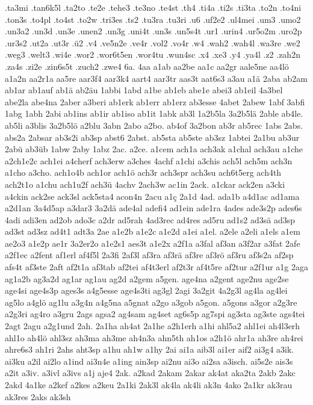 {.ta3mi
.tan6k5l
.ta2to
.te2e
.tehe3
.te3no
.te4st
.th4
.ti4a
.ti2s
.ti3ta
.to2n
.to4ni
.ton3s
.to4pl
.to4st
.to2w
.tri3es
.ts2
.tu3ra
.tu3ri
.u6
.uf2e2
.ul4mei
.um3
.umo2
.un3a2
.un3d
.un3e
.unen2
.un3g
.uni4t
.un3s
.un5s4t
.ur1
.urin4
.ur5o2m
.uro2p
.ur3s2
.ut2a
.ut3r
.ü2
.v4
.ve5n2e
.ve4r
.vol2
.vo4r
.w4
.wah2
.wah4l
.wa3re
.we2
.weg3
.welt3
.wi4e
.wor2
.wor6t5en
.wor4tu
.wun4sc
.x4
.xe3
.y4
.ya4l
.z2
.zah2n
.za4s
.zi2e
.zin6s5t
.zuch2
.zwe4
6a.
4aa
a1ab
aa2be
aa1c
aa2gr
aale5ne
aa4lö
a1a2n
aa2r1a
aa5re
aar3f4
aar3k4
aart4
aar3tr
aas3t
aat6s3
a3au
a1ä
2aba
ab2am
ab1ar
ab1auf
ab1ä
ab2äu
1abbi
1abd
a1be
ab1eb
abe1e
abei3
ab1eil
4a3bel
abe2la
abe4na
2aber
a3beri
ab1erk
ab1err
ab1erz
ab3esse
4abet
2abew
1abf
3abfi
1abg
1abh
2abi
ab1ins
ab1ir
ab1iso
ab1it
1abk
ab3l
1a2b5la
3a2b5lä
2able
ab4le.
ab5li
a3blis
3a2b5lö
a2blu
3abn
2abo
a2bo.
ab4of
3a2bon
ab3r
ab5rec
1abs
2abs.
abs2a
2absar
ab3s2i
ab3sp
abst6
2abst.
ab5sta
ab5ste
ab3sz
1abtei
2a1bu
ab3ur
2abü
ab3üb
1abw
2aby
1abz
2ac.
a2ce.
a1cem
ach1a
ach3ak
a1chal
ach3au
a1che
a2ch1e2c
ach1ei
a4cherf
ach3erw
a3ches
4achf
a1chi
a3chis
ach5l
ach5m
ach3n
a1cho
a3cho.
ach1o4b
ach1or
ach1ö
ach3r
ach3spr
ach3su
ach6t5erg
ach4th
ach2t1o
a1chu
ach1u2f
ach3ü
4achv
2ach3w
ac1in
2ack.
a1ckar
ack2en
a3cki
a4ckin
ack2se
ack3sl
ack5sta4
acon4n
2acu
a1ç
2a1d
4ad.
ada1b
a4d1ac
ad1ama
a2d1an
3a4d5ap
a3dar3
3a2dä
ade4al
adefi4
ad1ein
ade1ra
4ades
ade3s2p
ades6s
4adi
adi3en
ad2ob
ado3c
a2dr
ad5rah
4ad3rec
ad4res
ad5ru
ad1s2
ad3sä
ad3sp
ad3st
ad3sz
ad4t1
adt3a
2ae
a1e2b
a1e2c
a1e2d
a1ei
a1el.
a2ele
a2eli
a1els
a1em
ae2o3
a1e2p
ae1r
3a2er2o
a1e2s1
aes3t
a1e2x
a2f1a
a3fal
af3an
a3f2ar
a3fat
2afe
a2f1ec
a2fent
af1erl
af4f5l
2a3fi
2af3l
af3ra
af3rä
af3re
af3rö
af3ru
af3s2a
af2sp
afs4t
af3ste
2aft
af2t1a
af3tab
af2tei
af4t3erl
af2t3r
af4t5re
af2tur
a2f1ur
a1g
2aga
ag1a2b
ag3a2d
ag1ar
ag1au
ag2d
a2gem
a5gen.
age4na
a2gent
age2nu
age2se
age4si
age4s3p
ages3s
a4g5esse
age4s3ti
ag3gl
2agi
3a2git
4a2g3l
ag4la
ag4lei
ag5lo
a4glö
ag1lu
a3g4n
a4g5na
a5gnat
a2go
a3gob
a5gon.
a5gons
a3gor
a2g3re
a2g3ri
ag4ro
a3gru
2ags
agsa2
ag4sam
ag4set
ag6s5p
ag7spi
ag3sta
ag3ste
ags4tei
2agt
2agu
a2g1und
2ah.
2a1ha
ah4at
2a1he
a2h1erh
a1hi
ahl5a2
ahl1ei
ah4l3erh
ahl1o
ah4lö
ahl3sz
ah3ma
ah3me
ah4n3a
ahn5th
ah1os
a2h1ö
ahr1a
ah3re
ah4rei
ahre6s3
ah1ri
2ahs
aht3sp
a1hu
ah1w
a1hy
2ai
ai1a
aib3l
ai1er
aif2
ai3g4
a3ik.
ai3ku
a2il
ai2lo
a1ind
ai3n4e
a1ing
ain3sp
ai2nu
ai3o
ai2sa
a3isch.
ai5s2e
ais3s
a2it
a3iv.
a3ivl
a3ivs
a1j
aje4
2ak.
a2kad
2akam
2akar
ak4at
aka2ta
2akb
2akc
2akd
4a1ke
a2kef
a2kes
a2keu
2a1ki
2ak3l
ak4la
ak4li
ak3n
4ako
2a1kr
ak3rau
ak3res
2aks
ak3sh
}
